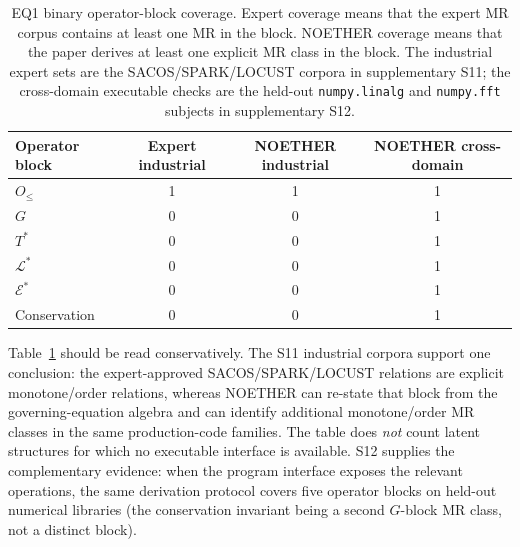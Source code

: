 \documentclass[manuscript]{acmart}
\begin{document}
\begin{table}[h]
\centering
\caption{EQ1 binary operator-block coverage. Expert coverage means that the
expert MR corpus contains at least one MR in the block. NOETHER coverage means
that the paper derives at least one explicit MR class in the block. The
industrial expert sets are the SACOS/SPARK/LOCUST corpora in supplementary S11;
the cross-domain executable checks are the held-out \texttt{numpy.linalg} and
\texttt{numpy.fft} subjects in supplementary S12.}
\label{tab:expert-noether-binary-coverage}
\small
\begin{tabular}{lccc}
\toprule
Operator block & Expert industrial & NOETHER industrial & NOETHER cross-domain \\
\midrule
$O_{\le}$ & 1 & 1 & 1 \\
$G$ & 0 & 0 & 1 \\
$T^{*}$ & 0 & 0 & 1 \\
$\mathcal{L}^{*}$ & 0 & 0 & 1 \\
$\mathcal{E}^{*}$ & 0 & 0 & 1 \\
Conservation & 0 & 0 & 1 \\
\bottomrule
\end{tabular}
\end{table}

Table~\ref{tab:expert-noether-binary-coverage} should be read conservatively.
The S11 industrial corpora support one conclusion: the expert-approved
SACOS/SPARK/LOCUST relations are explicit monotone/order relations, whereas
NOETHER can re-state that block from the governing-equation algebra and can
identify additional monotone/order MR classes in the same production-code
families. The table does \emph{not} count latent structures for which no
executable interface is available. S12 supplies the complementary evidence:
when the program interface exposes the relevant operations, the same derivation
protocol covers five operator blocks on held-out numerical libraries (the conservation invariant being a second $G$-block MR class, not a distinct block).
\end{document}
